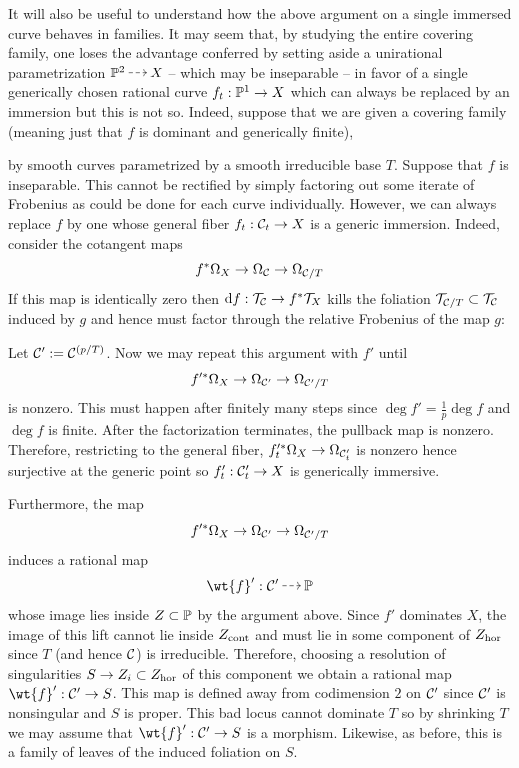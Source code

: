\documentclass[main.tex]{subfiles}
\begin{document}
It will also be useful to understand how the above argument on a single immersed curve behaves in families. It may seem that, by studying the entire covering family, one loses the advantage conferred by setting aside a unirational parametrization $\P^2 \rat X$ -- which may be inseparable -- in favor of a single generically chosen rational curve $f_t : \P^1 \to X$ which can always be replaced by an immersion but this is not so. Indeed, suppose that we are given a covering family (meaning just that $f$ is dominant and generically finite),
\begin{center}
\end{center}
by smooth curves parametrized by a smooth irreducible base $T$. Suppose that $f$ is inseparable. This cannot be rectified by simply factoring out some iterate of Frobenius as could be done for each curve individually. However, we can always replace $f$ by one whose general fiber $f_t : \cC_t \to X$ is a generic immersion. Indeed, consider the cotangent maps
\[ f^* \Omega_X \to \Omega_{\cC} \to \Omega_{\cC/T} \]
If this map is identically zero then $\d{f} : \T_{\cC} \to f^* \T_{X}$ kills the foliation $\T_{\cC/T} \subset \T_{\cC}$ induced by $g$ and hence must factor through the relative Frobenius of the map $g$:
\begin{center}
\end{center}
Let $\cC' := \cC^{(p/T)}$. Now we may repeat this argument with $f'$ until 
\[ f'^* \Omega_X \to \Omega_{\cC'} \to \Omega_{\cC'/T} \]
is nonzero. This must happen after finitely many steps since $\deg{f'} = \frac{1}{p} \deg{f}$ and $\deg{f}$ is finite. After the factorization terminates, the pullback map is nonzero. Therefore, restricting to the general fiber, $f_t'^* \Omega_X \to \Omega_{\cC'_t}$ is nonzero hence surjective at the generic point so $f'_t : \cC'_t \to X$ is generically immersive. 
\par 
Furthermore, the map 
\[ f'^* \Omega_X \to \Omega_{\cC'} \to \Omega_{\cC'/T} \]
induces a rational map
\[ \wt{f}' : \cC' \rat \P \]
whose image lies inside $Z \subset \P$ by the argument above. Since $f'$ dominates $X$, the image of this lift cannot lie inside $\Zcont$ and must lie in some component of $\Zhor$ since $T$ (and hence $\cC$) is irreducible. Therefore, choosing a resolution of singularities $S \to Z_i \subset \Zhor$ of this component we obtain a rational map $\wt{f}' : \cC' \to S$. This map is defined away from codimension $2$ on $\cC'$ since $\cC'$ is nonsingular and $S$ is proper. This bad locus cannot dominate $T$ so by shrinking $T$ we may assume that $\wt{f}' : \cC' \to S$ is a morphism. Likewise, as before, this is a family of leaves of the induced foliation on $S$. 
\end{document}

